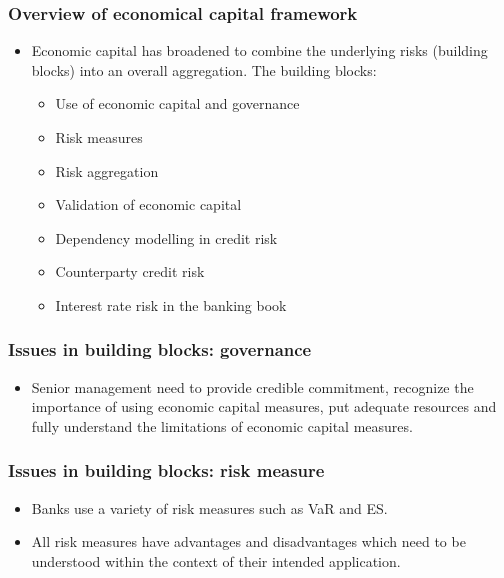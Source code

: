 \subsubsection{Overview of economical capital framework}
\begin{itemize}
\item Economic capital has broadened to combine the underlying risks (building blocks) into an overall aggregation. The building blocks:
    \begin{itemize}
    \item Use of economic capital and governance
    \item Risk measures
    \item Risk aggregation
    \item Validation of economic capital
    \item Dependency modelling in credit risk
    \item Counterparty credit risk
    \item Interest rate risk in the banking book
    \end{itemize}
\end{itemize}


\subsubsection{Issues in building blocks: governance}
\begin{itemize}
\item Senior management need to provide credible commitment, recognize the importance of using economic capital measures, put adequate resources and fully understand the limitations of economic capital measures.
\end{itemize}


\subsubsection{Issues in building blocks: risk measure}
\begin{itemize}
\item Banks use a variety of risk measures such as VaR and ES.
\item All risk measures have advantages and disadvantages which need to be understood within the context of their intended application.
\end{itemize}


